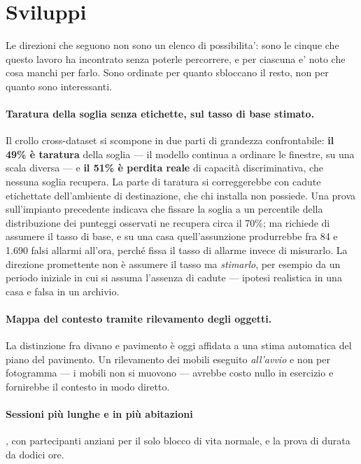 \section{Sviluppi}
\label{sec:sviluppi}

Le direzioni che seguono non sono un elenco di possibilita': sono le cinque
che questo lavoro ha incontrato senza poterle percorrere, e per ciascuna e'
noto che cosa manchi per farlo. Sono ordinate per quanto sbloccano il resto,
non per quanto sono interessanti.

\paragraph{Taratura della soglia senza etichette, sul tasso di base stimato.} Il crollo cross-dataset si scompone in due parti di grandezza confrontabile: \textbf{il 49\% è taratura} della soglia --- il modello continua a ordinare le finestre, su una scala diversa --- e \textbf{il 51\% è perdita reale} di capacità discriminativa, che nessuna soglia recupera. La parte di taratura si correggerebbe con cadute etichettate dell'ambiente di destinazione, che chi installa non possiede. Una prova sull'impianto precedente indicava che fissare la soglia a un percentile della distribuzione dei punteggi osservati ne recupera circa il 70\%; ma richiede di assumere il tasso di base, e su una casa quell'assunzione produrrebbe fra 84 e 1.690 falsi allarmi all'ora, perché fissa il tasso di allarme invece di misurarlo. La direzione promettente non è assumere il tasso ma \emph{stimarlo}, per esempio da un periodo iniziale in cui si assuma l'assenza di cadute --- ipotesi realistica in una casa e falsa in un archivio.

\paragraph{Mappa del contesto tramite rilevamento degli oggetti.} La distinzione fra divano e pavimento è oggi affidata a una stima automatica del piano del pavimento. Un rilevamento dei mobili eseguito \emph{all'avvio} e non per fotogramma --- i mobili non si muovono --- avrebbe costo nullo in esercizio e fornirebbe il contesto in modo diretto.

\paragraph{Sessioni più lunghe e in più abitazioni}, con partecipanti anziani per il solo blocco di vita normale, e la prova di durata da dodici ore.

